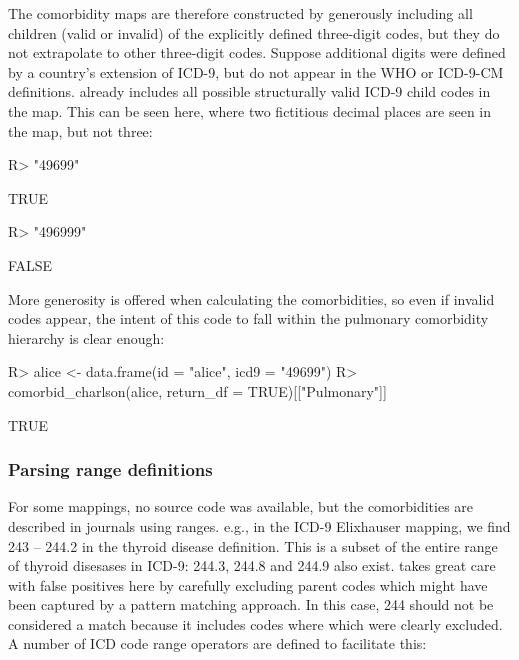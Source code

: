 \documentclass[article]{jss}
\begin{document}
The comorbidity maps are therefore constructed by generously including
all children (valid or invalid) of the explicitly defined three-digit
codes, but they do not extrapolate to other three-digit codes. Suppose
additional digits were defined by a country's extension of ICD-9, but do
not appear in the WHO or ICD-9-CM definitions.  already
includes all possible structurally valid ICD-9 child codes in the map.
This can be seen here, where two fictitious decimal places are seen in
the map, but not three:

\begin{CodeChunk}

\begin{CodeInput}
R> "49699" %
\end{CodeInput}

\begin{CodeOutput}
[1] TRUE
\end{CodeOutput}

\begin{CodeInput}
R> "496999" %
\end{CodeInput}

\begin{CodeOutput}
[1] FALSE
\end{CodeOutput}
\end{CodeChunk}

More generosity is offered when calculating the comorbidities, so even
if invalid codes appear, the intent of this code to fall within the
pulmonary comorbidity hierarchy is clear enough:

\begin{CodeChunk}

\begin{CodeInput}
R> alice <- data.frame(id = "alice", icd9 = "49699")
R> comorbid_charlson(alice, return_df = TRUE)[["Pulmonary"]]
\end{CodeInput}

\begin{CodeOutput}
[1] TRUE
\end{CodeOutput}
\end{CodeChunk}

\hypertarget{parsing-range-definitions}{%
\subsubsection{Parsing range
definitions}\label{parsing-range-definitions}}

For some mappings, no source code was available, but the comorbidities
are described in journals using ranges. e.g., in the ICD-9 Elixhauser
mapping, we find 243 -- 244.2 in the thyroid disease definition. This is
a subset of the entire range of thyroid disesases in ICD-9: 244.3, 244.8
and 244.9 also exist.  takes great care with false positives
here by carefully excluding parent codes which might have been captured
by a pattern matching approach. In this case, 244 should not be
considered a match because it includes codes where which were clearly
excluded. A number of ICD code range operators are defined to facilitate
this:
\end{document}
